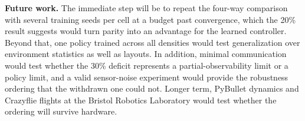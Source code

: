 \documentclass[a4paper, 10pt, conference]{ieeeconf}
\begin{document}
\textbf{Future work.} The immediate step will be to repeat the
four-way comparison with several training seeds per cell at a budget
past convergence, which the 20\% result suggests would turn parity
into an advantage for the learned controller. Beyond that, one policy
trained across all densities would test generalization over
environment statistics as well as layouts. In addition, minimal
communication would test whether the 30\% deficit represents a
partial-observability limit or a policy limit, and a valid
sensor-noise experiment would provide the robustness ordering that the
withdrawn one could not. Longer term, PyBullet dynamics and Crazyflie
flights at the Bristol Robotics Laboratory would test whether the
ordering will survive hardware.

{\footnotesize\linespread{0.90}\selectfont


}
\end{document}
